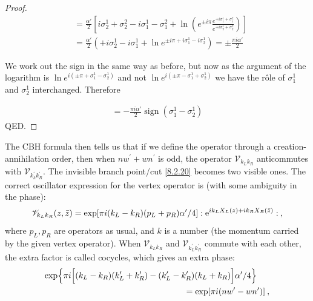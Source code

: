 \begin{tcolorbox}[breakable]
\begin{proof}
		\begin{align*}
			[X_R(z_1), X_R(z_2)] &= \frac{\alpha'}{2} \left[ i\sigma_2^1 + \sigma_2^2 - i\sigma_1^1 - \sigma_1^2 + \ln \left( e^{\pm i\pi} \frac{e^{+i\sigma_1^1 + \sigma_1^2}}{e^{+i\sigma_2^1 + \sigma_2^2}} \right) \right] \\
			&= \frac{\alpha'}{2} \left( +i\sigma_2^1 - i\sigma_1^1 + \ln e^{\pm i\pi + i\sigma_1^1 - i\sigma^1_2} \right) = \pm \frac{\pi i\alpha'}{2}
		\end{align*}
		
		We work out the sign in the same way as before, but now as the argument of the logarithm is \(\ln e^{i(\pm\pi + \sigma_1^1 - \sigma_2^1)}\) and not \(\ln e^{i(\pm\pi - \sigma_1^1 + \sigma_2^1)}\) we have the rôle of \(\sigma_1^1\) and \(\sigma_2^1\) interchanged. Therefore
		
		\begin{align*}
			[X_R(z_1), X_R(z_2)] = -\frac{\pi i\alpha'}{2} \operatorname{sign}(\sigma_1^1 - \sigma_2^1)
		\end{align*}
		QED.
	\end{proof}
\end{tcolorbox}
The CBH formula then tells us that if we define the operator through a creation-annihilation order, then when $n w^{\prime}+w n^{\prime}$ is odd, the operator $\mathscr{V}_{k_{L} k_{R}}$ anticommutes with $\mathscr{V}_{k_{k}^{\prime} k_{R}^{\prime}}$. The invisible branch point/cut \eqref{8.2.20} becomes two visible ones.
The correct oscillator expression for the vertex operator is (with some ambiguity in the phase):
\begin{equation}
	\mathscr{V}_{k_{L} k_{R}}(z, \bar{z})=\exp [\pi i(k_{L}-k_{R})(p_{L}+p_{R}) \alpha^{\prime} / 4] 
	\mathrel{\mathrel{:} \mathrm{e}^{i k_{L} X_{L}(z)+i k_{R} X_{R}(\bar{z})} \mathrel{:}} \:, \label{8.2.22}
\end{equation}
where $p_L, p_R$ are operators as usual, and $k$ is a number (the momentum carried by the given vertex operator).
When $\mathscr{V}_{k_{L} k_{R}}$ and $\mathscr{V}_{k_{L}^{\prime} k_{R}^{\prime}}$ commute with each other, the extra factor is called cocycles, which gives an extra phase:
\begin{align}
	\exp \Bigl\{\pi i\Bigl[(k_{L}-k_{R})(k_{L}^{\prime}+k_{R}^{\prime})-(k_{L}^{\prime}-k_{R}^{\prime})(k_{L}+k_{R})\Bigr] 
	\alpha^{\prime} / 4\Bigr\}\quad &  \nonumber \\
	=\exp [\pi i(n w^{\prime}-w n^{\prime})] &\:, \label{8.2.23}
\end{align}
